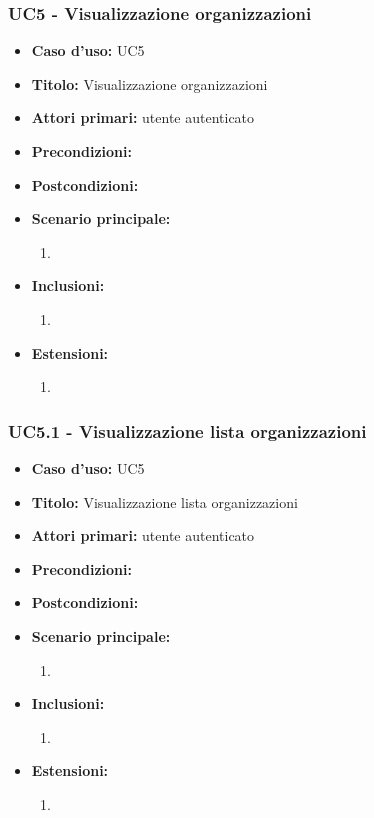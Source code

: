\documentclass[casi-duso]{subfiles}
\begin{document}
\subsubsection{UC5 - Visualizzazione organizzazioni}
\label{subsub:uc5utente}
\begin{itemize}
  \item \textbf{Caso d’uso:} UC5 
  \item \textbf{Titolo:} Visualizzazione organizzazioni
  \item \textbf{Attori primari:} utente autenticato
  \item \textbf{Precondizioni:} 
  \item \textbf{Postcondizioni:}
  \item \textbf{Scenario principale:} 
  \begin{enumerate}
    \item 
  \end{enumerate}  
  \item \textbf{Inclusioni:} 
  \begin{enumerate}
    \item 
  \end{enumerate}
  \item \textbf{Estensioni:} 
  \begin{enumerate}
    \item 
  \end{enumerate}  
\end{itemize}

\subsubsection{UC5.1 - Visualizzazione lista organizzazioni}
\label{subsub:uc5utente}
\begin{itemize}
  \item \textbf{Caso d’uso:} UC5 
  \item \textbf{Titolo:} Visualizzazione lista organizzazioni
  \item \textbf{Attori primari:} utente autenticato
  \item \textbf{Precondizioni:} 
  \item \textbf{Postcondizioni:}
  \item \textbf{Scenario principale:} 
  \begin{enumerate}
    \item 
  \end{enumerate}  
  \item \textbf{Inclusioni:} 
  \begin{enumerate}
    \item 
  \end{enumerate}
  \item \textbf{Estensioni:} 
  \begin{enumerate}
    \item 
  \end{enumerate}  
\end{itemize}
\end{document}
